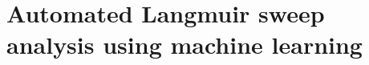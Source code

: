 \graphicspath{{../Thesis/Appendix/appendix_autosweep/}}

\chapter{Automated Langmuir sweep analysis using machine learning}
\label{app:autosweep}

